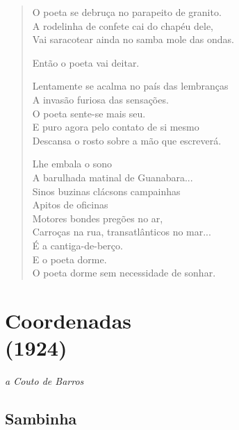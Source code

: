 \begin{verse}
O poeta se debruça no parapeito de granito.\\
A rodelinha de confete cai do chapéu dele,\\
Vai saracotear ainda no samba mole das ondas.

Então o poeta vai deitar.

Lentamente se acalma no país das lembranças\\
A invasão furiosa das sensações.\\
O poeta sente-se mais seu.\\
E puro agora pelo contato de si mesmo\\
Descansa o rosto sobre a mão que escreverá.

Lhe embala o sono\\
A barulhada matinal de Guanabara...\\
Sinos buzinas clácsons campainhas\\
Apitos de oficinas\\
Motores bondes pregões no ar,\\
Carroças na rua, transatlânticos no mar...\\
É a cantiga-de-berço.\\
E o poeta dorme.\\

O poeta dorme sem necessidade de sonhar.
\end{verse}

\chapter[\textsc{coordenadas}\\Sambinha]{Coordenadas\\(1924)}

\hfill\emph{a Couto de Barros}

\section{Sambinha}

